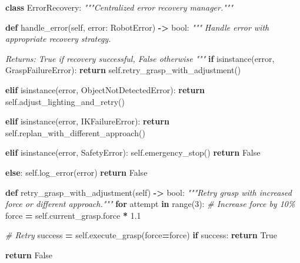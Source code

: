 \documentclass[
]{article}
\newenvironment{Shaded}{\begin{snugshade}}{\end{snugshade}}
\newcommand{\BuiltInTok}[1]{#1}
\newcommand{\CommentTok}[1]{\textcolor[rgb]{0.56,0.35,0.01}{\textit{#1}}}
\newcommand{\ControlFlowTok}[1]{\textcolor[rgb]{0.13,0.29,0.53}{\textbf{#1}}}
\newcommand{\DecValTok}[1]{\textcolor[rgb]{0.00,0.00,0.81}{#1}}
\newcommand{\FloatTok}[1]{\textcolor[rgb]{0.00,0.00,0.81}{#1}}
\newcommand{\KeywordTok}[1]{\textcolor[rgb]{0.13,0.29,0.53}{\textbf{#1}}}
\newcommand{\NormalTok}[1]{#1}
\newcommand{\OperatorTok}[1]{\textcolor[rgb]{0.81,0.36,0.00}{\textbf{#1}}}
\newcommand{\VariableTok}[1]{\textcolor[rgb]{0.00,0.00,0.00}{#1}}
\begin{document}
\begin{Shaded}
\begin{Highlighting}[]
\KeywordTok{class}\NormalTok{ ErrorRecovery:}
    \CommentTok{"""Centralized error recovery manager."""}

    \KeywordTok{def}\NormalTok{ handle\_error(}\VariableTok{self}\NormalTok{, error: RobotError) }\OperatorTok{{-}\textgreater{}} \BuiltInTok{bool}\NormalTok{:}
        \CommentTok{"""}
\CommentTok{        Handle error with appropriate recovery strategy.}

\CommentTok{        Returns:}
\CommentTok{            True if recovery successful, False otherwise}
\CommentTok{        """}
        \ControlFlowTok{if} \BuiltInTok{isinstance}\NormalTok{(error, GraspFailureError):}
            \ControlFlowTok{return} \VariableTok{self}\NormalTok{.retry\_grasp\_with\_adjustment()}

        \ControlFlowTok{elif} \BuiltInTok{isinstance}\NormalTok{(error, ObjectNotDetectedError):}
            \ControlFlowTok{return} \VariableTok{self}\NormalTok{.adjust\_lighting\_and\_retry()}

        \ControlFlowTok{elif} \BuiltInTok{isinstance}\NormalTok{(error, IKFailureError):}
            \ControlFlowTok{return} \VariableTok{self}\NormalTok{.replan\_with\_different\_approach()}

        \ControlFlowTok{elif} \BuiltInTok{isinstance}\NormalTok{(error, SafetyError):}
            \VariableTok{self}\NormalTok{.emergency\_stop()}
            \ControlFlowTok{return} \VariableTok{False}

        \ControlFlowTok{else}\NormalTok{:}
            \VariableTok{self}\NormalTok{.log\_error(error)}
            \ControlFlowTok{return} \VariableTok{False}

    \KeywordTok{def}\NormalTok{ retry\_grasp\_with\_adjustment(}\VariableTok{self}\NormalTok{) }\OperatorTok{{-}\textgreater{}} \BuiltInTok{bool}\NormalTok{:}
        \CommentTok{"""Retry grasp with increased force or different approach."""}
        \ControlFlowTok{for}\NormalTok{ attempt }\KeywordTok{in} \BuiltInTok{range}\NormalTok{(}\DecValTok{3}\NormalTok{):}
            \CommentTok{\# Increase force by 10\%}
\NormalTok{            force }\OperatorTok{=} \VariableTok{self}\NormalTok{.current\_grasp.force }\OperatorTok{*} \FloatTok{1.1}

            \CommentTok{\# Retry}
\NormalTok{            success }\OperatorTok{=} \VariableTok{self}\NormalTok{.execute\_grasp(force}\OperatorTok{=}\NormalTok{force)}
            \ControlFlowTok{if}\NormalTok{ success:}
                \ControlFlowTok{return} \VariableTok{True}

        \ControlFlowTok{return} \VariableTok{False}
\end{Highlighting}
\end{Shaded}
\end{document}
